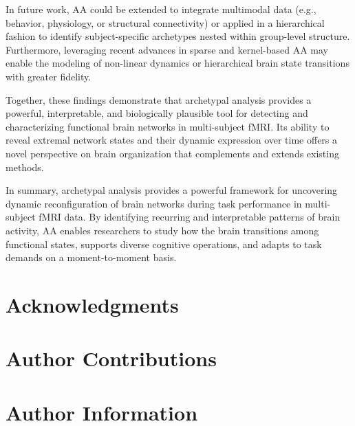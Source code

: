 \documentclass[12pt]{article}
\begin{document}
In future work, AA could be extended to integrate multimodal data (e.g., behavior, physiology, or structural connectivity) or applied in a hierarchical fashion to identify subject-specific archetypes nested within group-level structure. Furthermore, leveraging recent advances in sparse and kernel-based AA may enable the modeling of non-linear dynamics or hierarchical brain state transitions with greater fidelity.

Together, these findings demonstrate that archetypal analysis provides a powerful, interpretable, and biologically plausible tool for detecting and characterizing functional brain networks in multi-subject fMRI. Its ability to reveal extremal network states and their dynamic expression over time offers a novel perspective on brain organization that complements and extends existing methods.


In summary, archetypal analysis provides a powerful framework for uncovering dynamic reconfiguration of brain networks during task performance in multi-subject fMRI data. By identifying recurring and interpretable patterns of brain activity, AA enables researchers to study how the brain transitions among functional states, supports diverse cognitive operations, and adapts to task demands on a moment-to-moment basis.

\section*{Acknowledgments}

\section*{Author Contributions}


\section*{Author Information}





\clearpage
\end{document}
